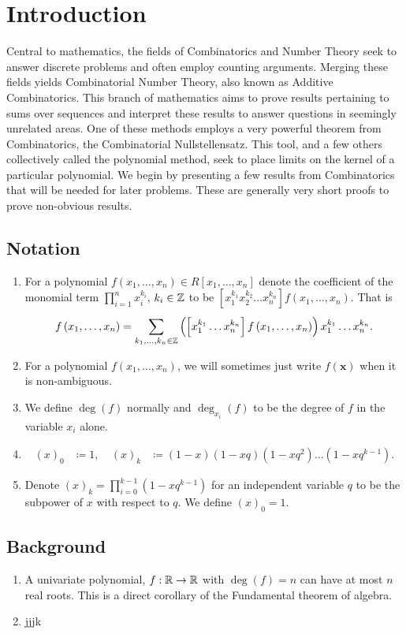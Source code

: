 \chapter{Introduction}\label{chap:intro}
\setcounter{section}{0}
\setcounter{subsection}{0}
\setcounter{page}{1}

Central to mathematics, the fields of Combinatorics and Number Theory seek to answer discrete problems and often employ counting arguments. Merging these fields yields Combinatorial Number Theory, also known as Additive Combinatorics. This branch of mathematics aims to prove results pertaining to sums over sequences and interpret these results to answer questions in seemingly unrelated areas. One of these methods employs a very powerful theorem from Combinatorics, the Combinatorial Nullstellensatz. This tool, and a few others collectively called the polynomial method, seek to place limits on the kernel of a particular polynomial. We begin by presenting a few results from Combinatorics that will be needed for later problems. These are generally very short proofs to prove non-obvious results.

\section{Notation}
\begin{enumerate}
	\item For a polynomial \(f\left( x_1,\ldots, x_{n} \right) \in R\left[ x_1, \ldots, x_{n} \right]  \) denote the coefficient of the monomial term \(\prod_{i= 1}^{n} x_{i}^{k_{i}}\), \(k_{i} \in \mathbb{Z}\) to be \(\left[ x_1^{k_1}x_2^{k_2}\ldots x_{n}^{k_{n}} \right] f\left( x_1, \ldots, x_{n} \right)   \). That is \[
		f\left( x_1, \ldots, x_{n} \right) = \sum_{k_1, \ldots, k_{n} \in \mathbb{Z}}^{} \left( \left[ x_1^{k_1}\ldots x_{n}^{k_{n}} \right]f\left( x_1, \ldots, x_{n} \right)  \right) x_1^{k_1}\ldots x_{n}^{k_{n}} 	.\]
	\item For a polynomial \(f\left( x_1, \ldots, x_{n} \right) \), we will sometimes just write \(f\left( \textbf{x} \right) \) when it is non-ambiguous.
\item We define \(\deg \left( f \right)\) normally and \( \deg_{x_{i}} \left(  f \right)\) to be the degree of \(f\) in the variable \(x_{i}\) alone.
\item \begin{align*}
		\left( x \right)_{0} &\coloneqq 1 ,&\ \left( x \right) _{k} &\coloneqq \left( 1-x \right) \left( 1-xq \right) \left( 1-xq^2 \right) \ldots \left( 1-xq^{k-1} \right)
		.\end{align*}
	\item Denote \(\left( x \right) _{k} = \prod_{i=0}^{k-1} \left( 1-xq^{k-1} \right) \) for an independent variable \(q\) to be the subpower of \(x\) with respect to \(q\). We define \(\left( x \right) _{0} = 1\).
\end{enumerate}
\section{Background}
\begin{enumerate}
	\item A univariate polynomial, \(f : \mathbb{R} \to \mathbb{R}\) with \(\deg \left( f \right)  = n\) can have at most \(n\) real roots. This is a direct corollary of the Fundamental theorem of algebra.
		\item jjjk
\end{enumerate}
